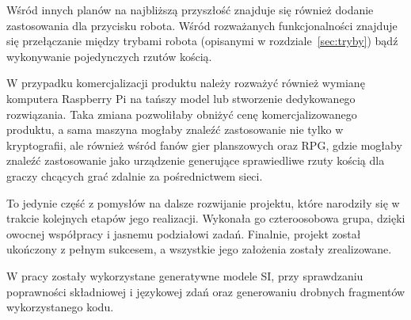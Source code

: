 Wśród innych planów na najbliższą przyszłość znajduje się również dodanie zastosowania dla przycisku robota. Wśród rozważanych funkcjonalności znajduje się
przełączanie między trybami robota (opisanymi w rozdziale~\ref{sec:tryby}) bądź wykonywanie pojedynczych rzutów kością.

W przypadku komercjalizacji produktu należy rozważyć również wymianę komputera Raspberry Pi na tańszy model lub stworzenie dedykowanego rozwiązania.
Taka zmiana pozwoliłaby obniżyć cenę komercjalizowanego produktu, a sama maszyna mogłaby znaleźć zastosowanie nie tylko w kryptografii,
ale również wśród fanów gier planszowych oraz RPG, gdzie mogłaby znaleźć zastosowanie jako urządzenie generujące sprawiedliwe rzuty kością
dla graczy chcących grać zdalnie za pośrednictwem sieci.

To jedynie część z pomysłów na dalsze rozwijanie projektu, które narodziły się w trakcie kolejnych etapów jego realizacji.
Wykonała go czteroosobowa grupa, dzięki owocnej współpracy i jasnemu podziałowi zadań. 
Finalnie, projekt został ukończony z pełnym sukcesem, a wszystkie jego założenia zostały zrealizowane.

W pracy zostały wykorzystane generatywne modele SI, przy sprawdzaniu poprawności składniowej i językowej zdań oraz generowaniu drobnych fragmentów wykorzystanego kodu.


